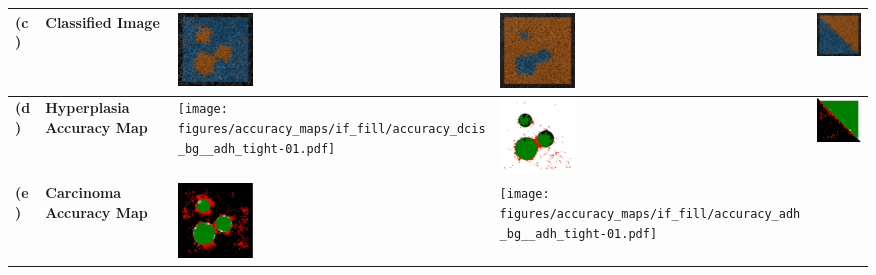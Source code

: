 \begin{minipage}{\linewidth}
\begin{center}
\begin{tabular}{>{\bfseries\centering}m{0.2in} >{\centering\bfseries}m{1in} >{\centering}m{1in} >{\centering}m{1in} >{\centering\arraybackslash}m{1in}}
			\\
			\hline
			(c)
			&
			Classified Image
			&
			\includegraphics[width=75px, frame]{figures/accuracy_maps/if_fill/adh_dcis_classified_dcis_bg_tight.png}
			&
			\includegraphics[width=75px, frame]{figures/accuracy_maps/if_fill/adh_dcis_classified_adh_bg_tight.png}
			&
			\includegraphics[width=75px, frame]{figures/accuracy_maps/if_fill/adh_dcis_slant_tight.png}
			\\
			\hline
			(d)
			&
			Hyperplasia Accuracy Map
			&
			\texttt{[image: figures/accuracy\_maps/if\_fill/accuracy\_dcis\_bg\_\_adh\_tight-01.pdf]}
			&
			\includegraphics[width=75px, frame]{figures/accuracy_maps/if_fill/accuracy_adh_bg__dcis_tight-01.pdf}
			&
			\includegraphics[width=75px, frame]{figures/accuracy_maps/if_fill/accuracy_slant_adh_bg__adh_tight-01.pdf}
			\\
			\hline
			(e)
			&
			Carcinoma Accuracy Map
			&
			\includegraphics[width=75px, frame]{figures/accuracy_maps/if_fill/accuracy_dcis_bg__dcis_tight-01.pdf}
			&
			\texttt{[image: figures/accuracy\_maps/if\_fill/accuracy\_adh\_bg\_\_adh\_tight-01.pdf]}

\end{tabular}
\end{center}
\end{minipage}
